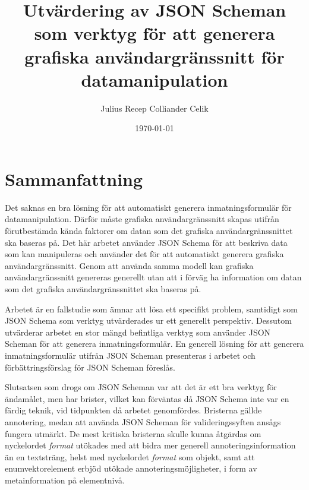 \documentclass[10pt,a4paper,titlepage,twoside]{report}
\begin{document}
\title{Utvärdering av JSON Scheman som verktyg för att generera grafiska användargränssnitt för datamanipulation}
\author{Julius Recep Colliander Celik}
\date{\today}

\frontmatter


\maketitle
\cleardoublepage
\cleardoublepage

\setlength{\parindent}{0pt}

\setlength{\parskip}{\baselineskip}

\section*{Sammanfattning}
Det saknas en bra lösning för att automatiskt generera inmatningsformulär för datamanipulation. Därför måste grafiska användargränssnitt skapas utifrån förutbestämda kända faktorer om datan som det grafiska användargränssnittet ska baseras på. Det här arbetet använder JSON Schema för att beskriva data som kan manipuleras och använder det för att automatiskt generera grafiska användargränssnitt. Genom att använda samma modell kan grafiska användargränssnitt genereras generellt utan att i förväg ha information om datan som det grafiska användargränssnittet ska baseras på.

Arbetet är en fallstudie som ämnar att lösa ett specifikt problem, samtidigt som JSON Schema som verktyg utvärderades ur ett generellt perspektiv. Dessutom utvärderar arbetet en stor mängd befintliga verktyg som använder JSON Scheman för att generera inmatningsformulär. En generell lösning för att generera inmatningsformulär utifrån JSON Scheman presenteras i arbetet och förbättringsförslag för JSON Scheman föreslås. 

Slutsatsen som drogs om JSON Scheman var att det är ett bra verktyg för ändamålet, men har brister, vilket kan förväntas då JSON Schema inte var en färdig teknik, vid tidpunkten då arbetet genomfördes. Bristerna gällde annotering, medan att använda JSON Scheman för valideringssyften ansågs fungera utmärkt. De mest kritiska bristerna skulle kunna åtgärdas om nyckelordet \textit{format} utökades med att bidra mer generell annoteringsinformation än en textsträng, helst med nyckelordet \textit{format} som objekt, samt att enumvektorelement erbjöd utökade annoteringsmöjligheter, i form av metainformation på elementnivå.
\end{document}
